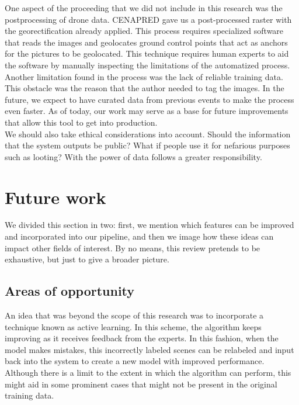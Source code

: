One aspect of the proceeding that we did not include in this research was the postprocessing of drone data. CENAPRED gave us a post-processed raster with the georectification already applied. This process requires specialized software that reads the images and geolocates ground control points that act as anchors for the pictures to be geolocated. This technique requires human experts to aid the software by manually inspecting the limitations of the automatized process.\\

Another limitation found in the process was the lack of reliable training data. This obstacle was the reason that the author needed to tag the images. In the future, we expect to have curated data from previous events to make the process even faster. As of today, our work may serve as a base for future improvements that allow this tool to get into production.\\

We should also take ethical considerations into account. Should the information that the system outputs be public? What if people use it for nefarious purposes such as looting? With the power of data follows a greater responsibility.\\

\section{Future work}

We divided this section in two: first, we mention which features can be improved and incorporated into our pipeline, and then we image how these ideas can impact other fields of interest. By no means, this review pretends to be exhaustive, but just to give a broader picture.\\

\subsection{Areas of opportunity}

An idea that was beyond the scope of this research was to incorporate a technique known as active learning. In this scheme, the algorithm keeps improving as it receives feedback from the experts. In this fashion, when the model makes mistakes, this incorrectly labeled scenes can be relabeled and input back into the system to create a new model with improved performance. Although there is a limit to the extent in which the algorithm can perform, this might aid in some prominent cases that might not be present in the original training data.\\

